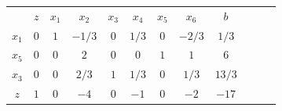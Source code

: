 \begin{frame}
	{
		\begin{table}
			\begin{tabular}{c c c c c c c c c c c c}
				& \cellcolor{blue!80} \color{white} $ \scriptstyle z$
				& \cellcolor{blue!80} \color{red} $ \scriptstyle x_1$ 
				& \cellcolor{blue!80} \color{white} $ \scriptstyle x_2$
				& \cellcolor{blue!80} \color{red} $ \scriptstyle x_3$
				& \cellcolor{blue!80} \color{white} $ \scriptstyle x_4$
				& \cellcolor{blue!80} \color{red} $ \scriptstyle x_5$
				& \cellcolor{blue!80} \color{white} $ \scriptstyle x_6$ 
				& \cellcolor{blue!80} \color{white} $ \scriptstyle b$ \\
				\cellcolor{blue!80} \color{red} $ \scriptstyle x_1$
				& \cellcolor{yellow!60}  $ \scriptstyle 0$
				& \cellcolor{yellow!60}  $ \scriptstyle 1$ 
				& \cellcolor{yellow!60}  $ \scriptstyle -1/3$
				& \cellcolor{yellow!60}  $ \scriptstyle 0$
				& \cellcolor{yellow!60}  $ \scriptstyle 1/3$
				& \cellcolor{yellow!60}  $ \scriptstyle 0$
				& \cellcolor{yellow!60}  $ \scriptstyle -2/3$ 
				& \cellcolor{yellow!60}  $ \scriptstyle 1/3$ \\ 
				\cellcolor{blue!80} \color{red} $ \scriptstyle x_5$  
				& \cellcolor{yellow!60}  $ \scriptstyle 0$
				& \cellcolor{yellow!60}  $ \scriptstyle 0$ 
				& \cellcolor{yellow!60}  $ \scriptstyle 2$
				& \cellcolor{yellow!60}  $ \scriptstyle 0$
				& \cellcolor{yellow!60}  $ \scriptstyle 0$
				& \cellcolor{yellow!60}  $ \scriptstyle 1$
				& \cellcolor{yellow!60}  $ \scriptstyle 1$ 
				& \cellcolor{yellow!60}  $ \scriptstyle 6$ \\
				\cellcolor{blue!80} \color{red} $ \scriptstyle x_3$
				& \cellcolor{yellow!60}  $ \scriptstyle 0$
				& \cellcolor{yellow!60}  $ \scriptstyle 0$ 
				& \cellcolor{yellow!60}  $ \scriptstyle 2/3$
				& \cellcolor{yellow!60}  $ \scriptstyle 1$
				& \cellcolor{yellow!60}  $ \scriptstyle 1/3$
				& \cellcolor{yellow!60}  $ \scriptstyle 0$
				& \cellcolor{yellow!60}  $ \scriptstyle 1/3$ 
				& \cellcolor{yellow!60}  $ \scriptstyle 13/3$ \\
				\cellcolor{blue!80} \color{white} $ \scriptstyle z$
				& \cellcolor{yellow!60}  $ \scriptstyle 1$
				& \cellcolor{yellow!60}  $ \scriptstyle 0$ 
				& \cellcolor{yellow!60}  $ \scriptstyle -4$
				& \cellcolor{yellow!60}  $ \scriptstyle 0$
				& \cellcolor{yellow!60}  $ \scriptstyle -1$
				& \cellcolor{yellow!60}  $ \scriptstyle 0$
				& \cellcolor{yellow!60}  $ \scriptstyle -2$ 
				& \cellcolor{yellow!60}  $ \scriptstyle -17$ \\

\end{tabular}
\end{table}}
\end{frame}
